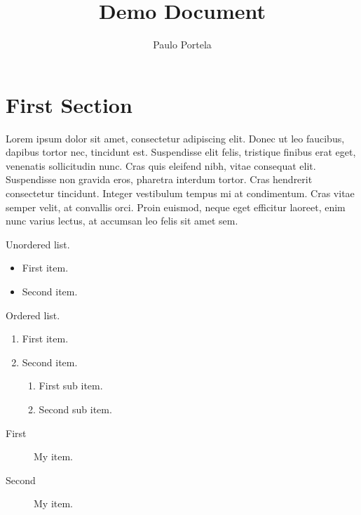 \documentclass{article}
\begin{document}
	\title{Demo Document}  %
	\author{Paulo Portela}  %
	\maketitle  %
	\thispagestyle{empty}  %
	\newpage
	
	\setcounter{page}{1}  %
	
	\tableofcontents
	\newpage
	
	\setcounter{page}{1}  %
	
	\section{First Section}
	
	Lorem ipsum dolor sit amet, consectetur adipiscing elit. Donec ut leo faucibus, dapibus tortor nec, tincidunt est. Suspendisse elit felis, tristique finibus erat eget, venenatis sollicitudin nunc. Cras quis eleifend nibh, vitae consequat elit. Suspendisse non gravida eros, pharetra interdum tortor. Cras hendrerit consectetur tincidunt. Integer vestibulum tempus mi at condimentum. Cras vitae semper velit, at convallis orci. Proin euismod, neque eget efficitur laoreet, enim nunc varius lectus, at accumsan leo felis sit amet sem.
	
	Unordered list.
	
	\begin{itemize}
		\item First item.
		\item Second item.
	\end{itemize}

	Ordered list.

	\begin{enumerate}
		\item First item.
		\item Second item.
			\begin{enumerate}
				\item First sub item.
				\item Second sub item.
			\end{enumerate}
	\end{enumerate}

	\begin{description}
		\item[First] My item.
		\item[Second] My item.
	\end{description}
\end{document}

